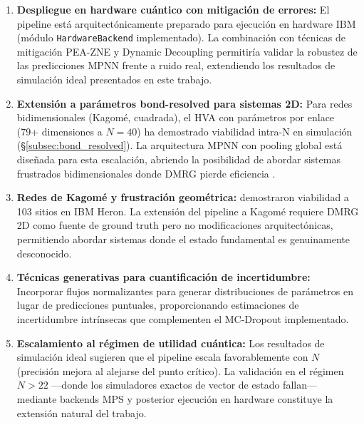 \documentclass[11pt,a4paper,spanish]{book}
\begin{document}
\begin{enumerate}
    \item \textbf{Despliegue en hardware cuántico con mitigación de errores:} El pipeline está arquitectónicamente preparado para ejecución en hardware IBM (módulo \texttt{HardwareBackend} implementado). La combinación con técnicas de mitigación PEA-ZNE \citep{kim2023} y Dynamic Decoupling \citep{pokharel2025} permitiría validar la robustez de las predicciones MPNN frente a ruido real, extendiendo los resultados de simulación ideal presentados en este trabajo.

    \item \textbf{Extensión a parámetros bond-resolved para sistemas 2D:} Para redes bidimensionales (Kagomé, cuadrada), el HVA con parámetros por enlace (79+ dimensiones a $N = 40$) ha demostrado viabilidad intra-N en simulación (§\ref{subsec:bond_resolved}). La arquitectura MPNN con pooling global está diseñada para esta escalación, abriendo la posibilidad de abordar sistemas frustrados bidimensionales donde DMRG pierde eficiencia \citep{martin2026}.

    \item \textbf{Redes de Kagomé y frustración geométrica:} \citet{ahsan2025} demostraron viabilidad a 103 sitios en IBM Heron. La extensión del pipeline a Kagomé requiere DMRG 2D como fuente de ground truth pero no modificaciones arquitectónicas, permitiendo abordar sistemas donde el estado fundamental es genuinamente desconocido.

    \item \textbf{Técnicas generativas para cuantificación de incertidumbre:} Incorporar flujos normalizantes \citep{zou2026} para generar distribuciones de parámetros en lugar de predicciones puntuales, proporcionando estimaciones de incertidumbre intrínsecas que complementen el MC-Dropout \citep{gal2016} implementado.

    \item \textbf{Escalamiento al régimen de utilidad cuántica:} Los resultados de simulación ideal sugieren que el pipeline escala favorablemente con $N$ (precisión mejora al alejarse del punto crítico). La validación en el régimen $N > 22$ ---donde los simuladores exactos de vector de estado fallan--- mediante backends MPS y posterior ejecución en hardware constituye la extensión natural del trabajo.


\end{enumerate}
\end{document}
